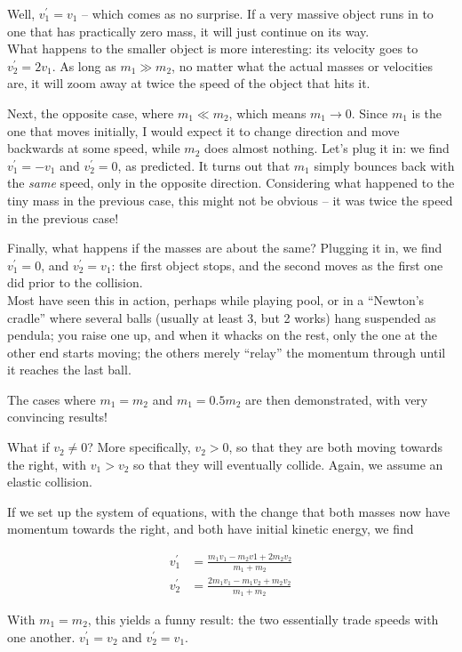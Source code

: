 Well, $v_1^{'} = v_1$ -- which comes as no surprise. If a very massive object runs in to one that has practically zero mass, it will just continue on its way.\\
What happens to the smaller object is more interesting: its velocity goes to $v_2^{'} = 2 v_1$. As long as $m_1 \gg m_2$, no matter what the actual masses or velocities are, it will zoom away at twice the speed of the object that hits it.

Next, the opposite case, where $m_1 \ll m_2$, which means $m_1 \to 0$. Since $m_1$ is the one that moves initially, I would expect it to change direction and move backwards at some speed, while $m_2$ does almost nothing. Let's plug it in: we find $v_1^{'} = -v_1$ and $v_2^{'} = 0$, as predicted. It turns out that $m_1$ simply bounces back with the \emph{same} speed, only in the opposite direction. Considering what happened to the tiny mass in the previous case, this might not be obvious -- it was twice the speed in the previous case!

Finally, what happens if the masses are about the same? Plugging it in, we find $v_1^{'} = 0$, and $v_2^{'} = v_1$: the first object stops, and the second moves as the first one did prior to the collision.\\
Most have seen this in action, perhaps while playing pool, or in a ``Newton's cradle'' where several balls (usually at least 3, but 2 works) hang suspended as pendula; you raise one up, and when it whacks on the rest, only the one at the other end starts moving; the others merely ``relay'' the momentum through until it reaches the last ball.

The cases where $m_1 = m_2$ and $m_1 = 0.5 m_2$ are then demonstrated, with very convincing results!

What if $v_2 \neq 0$? More specifically, $v_2 > 0$, so that they are both moving towards the right, with $v_1 > v_2$ so that they will eventually collide. Again, we assume an elastic collision.

If we set up the system of equations, with the change that both masses now have momentum towards the right, and both have initial kinetic energy, we find 

\begin{align}
v_1^{'} &= \frac{m_1 v_1 - m_2 v1 + 2 m_2 v_2}{m_1 + m_2}\\
v_2^{'} &= \frac{2 m_1 v_1 - m_1 v_2 + m_2 v_2}{m_1 + m_2}
\end{align}

With $m_1 = m_2$, this yields a funny result: the two essentially trade speeds with one another. $v_1^{'} = v_2$ and $v_2^{'} = v_1$.

